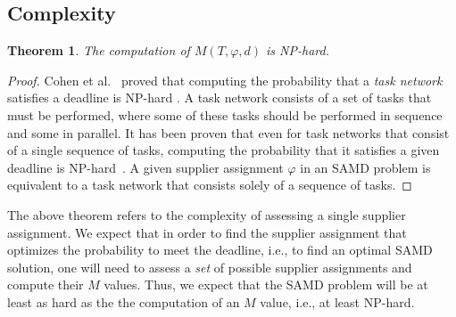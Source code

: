 \documentclass[letterpaper]{article} %
\newtheorem{theorem}{Theorem}
\newtheorem{corollary}{Corollary}
\newcommand{\samd}{\ac{SAMD}\xspace}
\begin{document}
\subsection{Complexity}
\begin{theorem}
The computation of $M(T, \varphi, d)$ is NP-hard.
\label{the:m}
\end{theorem}

\begin{proof}
Cohen et al.~ proved that computing the probability that a \emph{task network} satisfies a deadline is NP-hard \cite[Corollary 1]{cohen2019estimating}. A task network consists of a set of tasks that must be performed, where some of these tasks should be performed in sequence and some in parallel. It has been proven that even for task networks that consist of a single sequence of tasks, computing the probability that it satisfies a given deadline is NP-hard~\cite[Lemma 1]{cohen2019estimating}. A given supplier assignment $\varphi$ in an \samd problem is equivalent to a task network that consists solely of a sequence of tasks.%
\end{proof}
The above theorem refers to the complexity of assessing a single supplier assignment. We expect that in order to find the supplier assignment that optimizes the probability to meet the deadline, i.e., to find an optimal \samd solution, one will need to assess a \emph{set} of possible supplier assignments and compute their $M$ values. Thus, we expect that the \samd problem will be at least as hard as the the computation of an $M$ value, i.e., at least NP-hard. 
\end{document}
